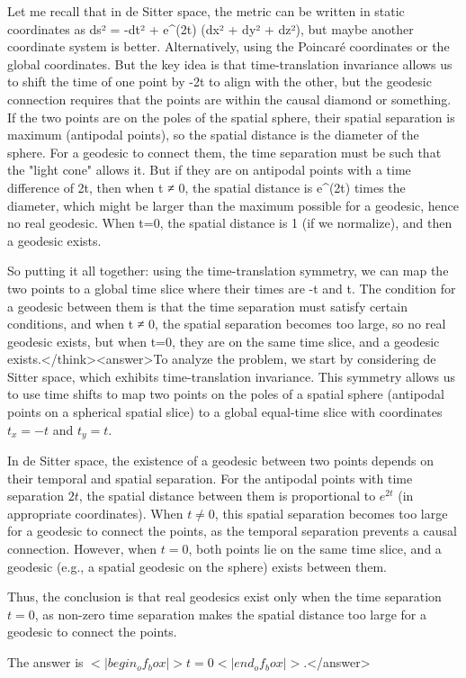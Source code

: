 Let me recall that in de Sitter space, the metric can be written in static coordinates as ds² = -dt² + e^(2t) (dx² + dy² + dz²), but maybe another coordinate system is better. Alternatively, using the Poincaré coordinates or the global coordinates. But the key idea is that time-translation invariance allows us to shift the time of one point by -2t to align with the other, but the geodesic connection requires that the points are within the causal diamond or something. If the two points are on the poles of the spatial sphere, their spatial separation is maximum (antipodal points), so the spatial distance is the diameter of the sphere. For a geodesic to connect them, the time separation must be such that the "light cone" allows it. But if they are on antipodal points with a time difference of 2t, then when t ≠ 0, the spatial distance is e^(2t) times the diameter, which might be larger than the maximum possible for a geodesic, hence no real geodesic. When t=0, the spatial distance is 1 (if we normalize), and then a geodesic exists. 

So putting it all together: using the time-translation symmetry, we can map the two points to a global time slice where their times are -t and t. The condition for a geodesic between them is that the time separation must satisfy certain conditions, and when t ≠ 0, the spatial separation becomes too large, so no real geodesic exists, but when t=0, they are on the same time slice, and a geodesic exists.</think><answer>To analyze the problem, we start by considering de Sitter space, which exhibits time-translation invariance. This symmetry allows us to use time shifts to map two points on the poles of a spatial sphere (antipodal points on a spherical spatial slice) to a global equal-time slice with coordinates \( t_x = -t \) and \( t_y = t \).  

In de Sitter space, the existence of a geodesic between two points depends on their temporal and spatial separation. For the antipodal points with time separation \( 2t \), the spatial distance between them is proportional to \( e^{2t} \) (in appropriate coordinates). When \( t \neq 0 \), this spatial separation becomes too large for a geodesic to connect the points, as the temporal separation prevents a causal connection. However, when \( t = 0 \), both points lie on the same time slice, and a geodesic (e.g., a spatial geodesic on the sphere) exists between them.  

Thus, the conclusion is that real geodesics exist only when the time separation \( t = 0 \), as non-zero time separation makes the spatial distance too large for a geodesic to connect the points.  

The answer is \(<|begin_of_box|>t = 0<|end_of_box|>\).</answer>